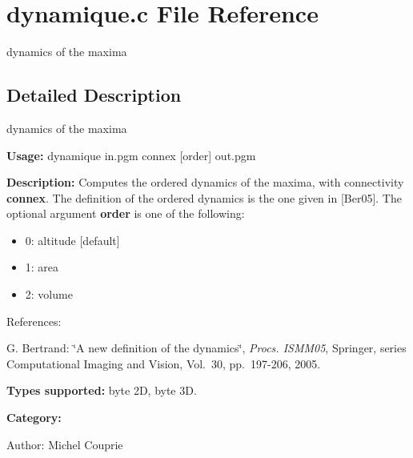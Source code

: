 \section{dynamique.c File Reference}
\label{dynamique_8c}
dynamics of the maxima 



\subsection{Detailed Description}
dynamics of the maxima 

{\bf Usage:} dynamique in.pgm connex [order] out.pgm

{\bf Description:} Computes the ordered dynamics of the maxima, with connectivity {\bf connex}. The definition of the ordered dynamics is the one given in [Ber05]. The optional argument {\bf order} is one of the following: \begin{itemize}
\item 0: altitude [default] \item 1: area \item 2: volume\end{itemize}
References:\par
 [Ber05] G. Bertrand: \char`\"{}A new definition of the dynamics\char`\"{}, {\em Procs. ISMM05\/}, Springer, series Computational Imaging and Vision, Vol.~30, pp.~197-206, 2005.\par


{\bf Types supported:} byte 2D, byte 3D.

{\bf Category:}

\begin{Desc}
\item[Author:]Michel Couprie \end{Desc}

